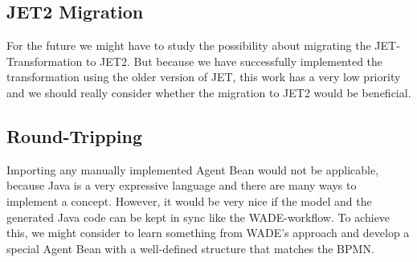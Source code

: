 \subsection{JET2 Migration}
For the future we might have to study the possibility about migrating the JET-Transformation to JET2. But because we have successfully implemented the transformation using the older version of JET, this work has a very low priority and we should really consider whether the migration to JET2 would be beneficial. 

\subsection{Round-Tripping}
Importing any manually implemented Agent Bean would not be applicable, because Java is a very expressive language and there are many ways to implement a concept. However, it would be very nice if the model and the generated Java code can be kept in sync like the WADE-workflow. To achieve this, we might consider to learn something from WADE's approach and develop a special Agent Bean with a well-defined structure that matches the BPMN. 

